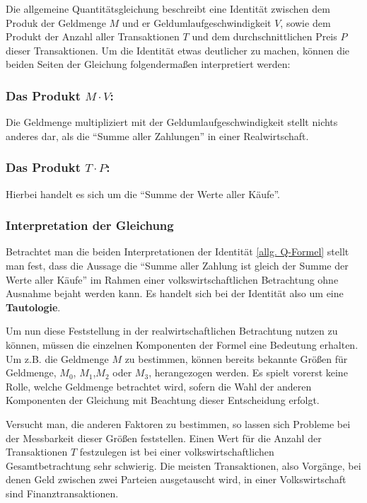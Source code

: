 Die allgemeine Quantitätsgleichung beschreibt eine Identität zwischen dem Produk der Geldmenge $M$ und er Geldumlaufgeschwindigkeit $V$, sowie dem Produkt der Anzahl aller Transaktionen $T$ und dem durchschnittlichen Preis $P$ dieser Transaktionen. Um die Identität etwas deutlicher zu machen, können die beiden Seiten der Gleichung folgendermaßen interpretiert werden:

\subsubsection*{Das Produkt $M \cdot V$:}
Die Geldmenge multipliziert mit der Geldumlaufgeschwindigkeit stellt nichts anderes dar, als die \enquote{Summe aller Zahlungen} in einer Realwirtschaft.

\subsubsection*{Das Produkt $T \cdot P$:}
Hierbei handelt es sich um die \enquote{Summe der Werte aller Käufe}.

\subsubsection*{Interpretation der Gleichung}
Betrachtet man die beiden Interpretationen der Identität \vref{allg. Q-Formel} stellt man fest, dass die Aussage die \enquote{Summe aller Zahlung ist gleich der Summe der Werte aller Käufe} im Rahmen einer volkswirtschaftlichen Betrachtung ohne Ausnahme bejaht werden kann. Es handelt sich bei der Identität also um eine \textbf{Tautologie}.

Um nun diese Feststellung in der realwirtschaftlichen Betrachtung nutzen zu können, müssen die einzelnen Komponenten der Formel eine Bedeutung erhalten. Um z.B. die Geldmenge $M$ zu bestimmen, können bereits bekannte Größen für Geldmenge, $M_0$, $M_1$,$M_2$ oder $M_3$, herangezogen werden. Es spielt vorerst keine Rolle, welche Geldmenge betrachtet wird, sofern die Wahl der anderen Komponenten der Gleichung mit Beachtung dieser Entscheidung erfolgt.

Versucht man, die anderen Faktoren zu bestimmen, so lassen sich Probleme bei der Messbarkeit dieser Größen feststellen. Einen Wert für die Anzahl der Transaktionen $T$ festzulegen ist bei einer volkswirtschaftlichen Gesamtbetrachtung sehr schwierig. Die meisten Transaktionen, also Vorgänge, bei denen Geld zwischen zwei Parteien ausgetauscht wird, in einer Volkswirtschaft sind Finanztransaktionen.

